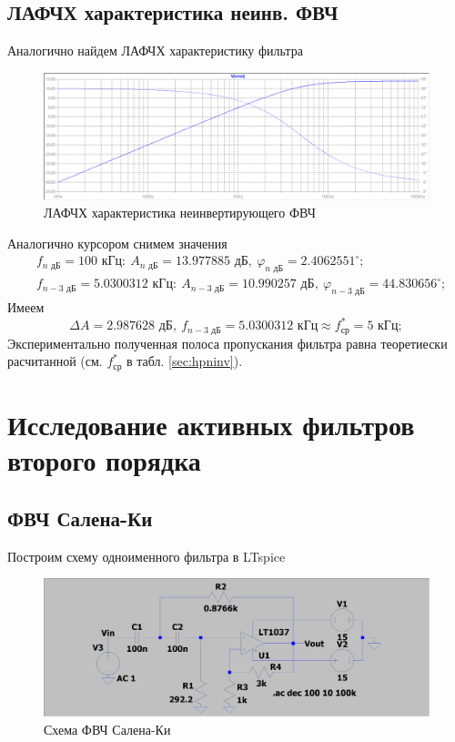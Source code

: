 \documentclass[a4paper, 12pt]{article}
\begin{document}
    \subsection{ЛАФЧХ характеристика неинв. ФВЧ}
    Аналогично найдем ЛАФЧХ характеристику фильтра
    \begin{figure}[H]
        \centering
        \includegraphics[scale=0.46]{2task_lapfr.png}
        \captionsetup{skip=0pt}
        \caption{ЛАФЧХ характеристика неинвертирующего ФВЧ}
        \label{fig:2task_lapfr}
    \end{figure}
    \noindent Аналогично курсором снимем значения
    \begin{align*}
    &f_{n\text{ дБ}}=100\text{ кГц}:\ A_{n\text{ дБ}}=13.977885\text{ дБ},\ \varphi_{n\text{ дБ}}=2.4062551^{\circ};\\
    &f_{n-3\text{ дБ}}=5.0300312 \text{ кГц}:\ A_{n-3\text{ дБ}}=10.990257\text{ дБ},\ \varphi_{n-3\text{ дБ}}=44.830656^{\circ};
    \end{align*}
    Имеем
    $$
    \Delta A=2.987628\text{ дБ},\ f_{n-3\text{ дБ}}=5.0300312\text{ кГц}\approx f_\text{ср}^*=5\text{ кГц};
    $$
    Экспериментально полученная полоса пропускания фильтра равна теоретиески расчитанной (см. $f_\text{ср}^*$ в табл. \ref{sec:hpninv}).


    \section{Исследование активных фильтров второго порядка}
    \subsection{ФВЧ Салена-Ки}
    Построим схему одноименного фильтра в LTspice
    \begin{figure}[H]
        \centering
        \includegraphics[scale=0.22]{scheme3.png}
        \captionsetup{skip=0pt}
        \caption{Схема ФВЧ Салена-Ки}
        \label{fig:scheme3}
    \end{figure}
\end{document}

